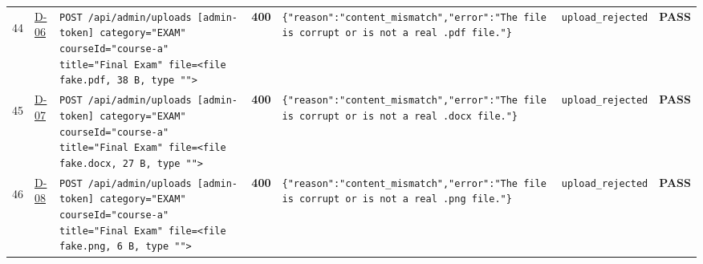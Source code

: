 \documentclass[10pt,a4paper]{article}
\begin{document}
\begin{landscape}
\begin{longtable}{@{}P{0.6cm}P{0.9cm}P{8.5cm}P{1.0cm}P{6.2cm}P{4.2cm}P{1.1cm}@{}}
\hypertarget{call44}{44} & \hyperlink{test-D-06}{D-06} & \texttt{POST /\allowbreak{}api/\allowbreak{}admin/\allowbreak{}uploads [admin-\allowbreak{}token] category=\allowbreak{}"\allowbreak{}EXAM"\allowbreak{} courseId=\allowbreak{}"\allowbreak{}course-\allowbreak{}a"\allowbreak{} title=\allowbreak{}"\allowbreak{}Final Exam"\allowbreak{} file=\allowbreak{}<file fake.\allowbreak{}pdf,\allowbreak{} 38 B,\allowbreak{} type "\allowbreak{}"\allowbreak{}>} & \textcolor{warnamber}{\textbf{400}} & \texttt{\{"\allowbreak{}reason"\allowbreak{}:\allowbreak{}"\allowbreak{}content\_\allowbreak{}mismatch"\allowbreak{},\allowbreak{}"\allowbreak{}error"\allowbreak{}:\allowbreak{}"\allowbreak{}The file is corrupt or is not a real .\allowbreak{}pdf file.\allowbreak{}"\allowbreak{}\}} & \texttt{upload\_\allowbreak{}rejected} & \textcolor{passgreen}{\textbf{PASS}} \\
\hypertarget{call45}{45} & \hyperlink{test-D-07}{D-07} & \texttt{POST /\allowbreak{}api/\allowbreak{}admin/\allowbreak{}uploads [admin-\allowbreak{}token] category=\allowbreak{}"\allowbreak{}EXAM"\allowbreak{} courseId=\allowbreak{}"\allowbreak{}course-\allowbreak{}a"\allowbreak{} title=\allowbreak{}"\allowbreak{}Final Exam"\allowbreak{} file=\allowbreak{}<file fake.\allowbreak{}docx,\allowbreak{} 27 B,\allowbreak{} type "\allowbreak{}"\allowbreak{}>} & \textcolor{warnamber}{\textbf{400}} & \texttt{\{"\allowbreak{}reason"\allowbreak{}:\allowbreak{}"\allowbreak{}content\_\allowbreak{}mismatch"\allowbreak{},\allowbreak{}"\allowbreak{}error"\allowbreak{}:\allowbreak{}"\allowbreak{}The file is corrupt or is not a real .\allowbreak{}docx file.\allowbreak{}"\allowbreak{}\}} & \texttt{upload\_\allowbreak{}rejected} & \textcolor{passgreen}{\textbf{PASS}} \\
\hypertarget{call46}{46} & \hyperlink{test-D-08}{D-08} & \texttt{POST /\allowbreak{}api/\allowbreak{}admin/\allowbreak{}uploads [admin-\allowbreak{}token] category=\allowbreak{}"\allowbreak{}EXAM"\allowbreak{} courseId=\allowbreak{}"\allowbreak{}course-\allowbreak{}a"\allowbreak{} title=\allowbreak{}"\allowbreak{}Final Exam"\allowbreak{} file=\allowbreak{}<file fake.\allowbreak{}png,\allowbreak{} 6 B,\allowbreak{} type "\allowbreak{}"\allowbreak{}>} & \textcolor{warnamber}{\textbf{400}} & \texttt{\{"\allowbreak{}reason"\allowbreak{}:\allowbreak{}"\allowbreak{}content\_\allowbreak{}mismatch"\allowbreak{},\allowbreak{}"\allowbreak{}error"\allowbreak{}:\allowbreak{}"\allowbreak{}The file is corrupt or is not a real .\allowbreak{}png file.\allowbreak{}"\allowbreak{}\}} & \texttt{upload\_\allowbreak{}rejected} & \textcolor{passgreen}{\textbf{PASS}} \\

\end{longtable}
\end{landscape}
\end{document}
